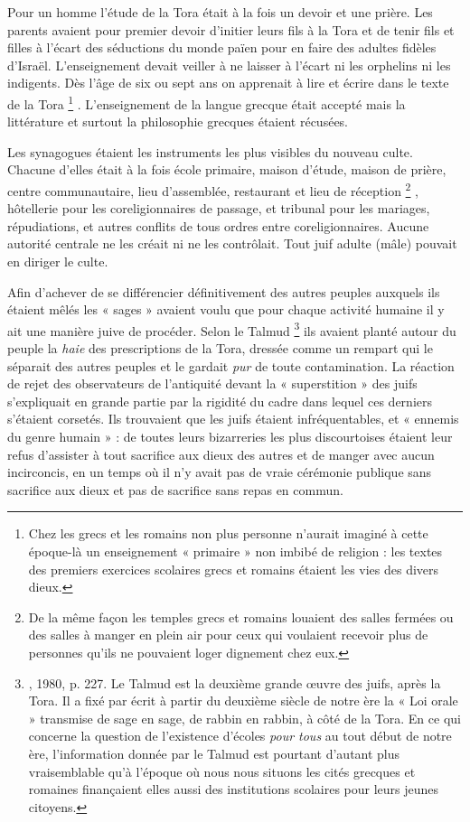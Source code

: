  Pour un homme l'étude de la Tora était à la fois un devoir et une prière. Les parents avaient pour premier devoir d'initier leurs fils à la Tora et de tenir fils et filles à l'écart des séductions du monde païen pour en faire des adultes fidèles d'Israël. L'enseignement devait veiller à ne laisser à l'écart ni les orphelins ni les indigents. Dès l'âge de six ou sept ans on apprenait à lire et écrire dans le texte de la Tora%
\footnote{Chez les grecs et les romains non plus personne n'aurait imaginé à cette époque-là un enseignement « primaire » non imbibé de religion : les textes des premiers exercices scolaires grecs et romains étaient les vies des divers dieux.}%
. L'enseignement de la langue grecque était accepté mais la littérature et surtout la philosophie grecques étaient récusées. 

 Les synagogues étaient les instruments les plus visibles du nouveau culte. Chacune d'elles était à la fois école primaire, maison d'étude, maison de prière, centre communautaire, lieu d'assemblée, restaurant et lieu de réception%
\footnote{De la même façon les temples grecs et romains louaient des salles fermées ou des salles à manger en plein air pour ceux qui voulaient recevoir plus de personnes qu'ils ne pouvaient loger dignement chez eux.}%
, hôtellerie pour les coreligionnaires de passage, et tribunal pour les mariages, répudiations, et autres conflits de tous ordres entre coreligionnaires. Aucune autorité centrale ne les créait ni ne les contrôlait. Tout juif adulte (mâle) pouvait en diriger le culte.

 Afin d'achever de se différencier définitivement des autres peuples auxquels ils étaient mêlés les « sages » avaient voulu que pour chaque activité humaine il y ait une manière juive de procéder. Selon le Talmud%
\footnote{, 1980, p. 227. Le Talmud est la deuxième grande œuvre des juifs, après la Tora. Il a fixé par écrit à partir du deuxième siècle de notre ère la « Loi orale » transmise de sage en sage, de rabbin en rabbin, à côté de la Tora. En ce qui concerne la question de l'existence d'écoles \emph{pour tous} au tout début de notre ère, l'information donnée par le Talmud est pourtant d'autant plus vraisemblable qu'à l'époque où nous nous situons les cités grecques et romaines finançaient elles aussi des institutions scolaires pour leurs jeunes citoyens.}
ils avaient planté autour du peuple la \emph{haie} des prescriptions de la Tora, dressée comme un rempart qui le séparait des autres peuples et le gardait \emph{pur} de toute contamination. La réaction de rejet des observateurs de l'antiquité devant la « superstition » des juifs s'expliquait en grande partie par la rigidité du cadre dans lequel ces derniers s'étaient corsetés. Ils trouvaient que les juifs étaient infréquentables, et « ennemis du genre humain » : de toutes leurs bizarreries les plus discourtoises étaient leur refus d'assister à tout sacrifice aux dieux des autres et de manger avec aucun incirconcis, en un temps où il n'y avait pas de vraie cérémonie publique sans sacrifice aux dieux et pas de sacrifice sans repas en commun. 

